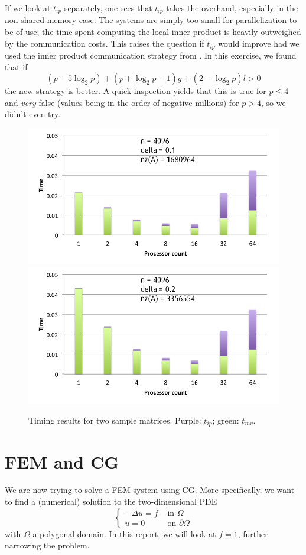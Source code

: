 \documentclass[11pt]{amsart}
\theoremstyle{definition}
\begin{document}
If we look at $t_{ip}$ separately, one sees that $t_{ip}$ takes the overhand, especially in the non-shared memory case. The systems are simply too small for parallelization to be of use; the time spent computing the local inner product is heavily outweighed by the communication costs. This raises the question if $t_{ip}$ would improve had we used the inner product communication strategy from \cite[Exercise~1.1]{biss04}. In this exercise, we found that if
\[
  (p - 5\log_2 p) + (p + \log_2 p - 1)g + (2-\log_2 p)l > 0
\]
the new strategy is better. A quick inspection yields that this is true for $p \leq 4$ and \emph{very} false (values being in the order of negative millions) for $p > 4$, so we didn't even try.

\begin{figure}
  \includegraphics[width=0.48\linewidth]{n4096d0_1mvip.png}
  \includegraphics[width=0.48\linewidth]{n4096d0_2mvip.png}
  \caption{Timing results for two sample matrices. Purple: $t_{ip}$; green: $t_{mv}$.}
  \label{fig:samples}
\end{figure}

\section{FEM and CG}
We are now trying to solve a FEM system using CG. More specifically, we want to find a (numerical) solution to the two-dimensional PDE
\begin{equation}
  \label{eqn:fem}
  \begin{cases} -\Delta u = f & \text{ in } \Omega \\ u = 0 & \text{ on } \partial \Omega \end{cases}
\end{equation}
with $\Omega$ a polygonal domain. In this report, we will look at $f=1$, further narrowing the problem.
\end{document}
